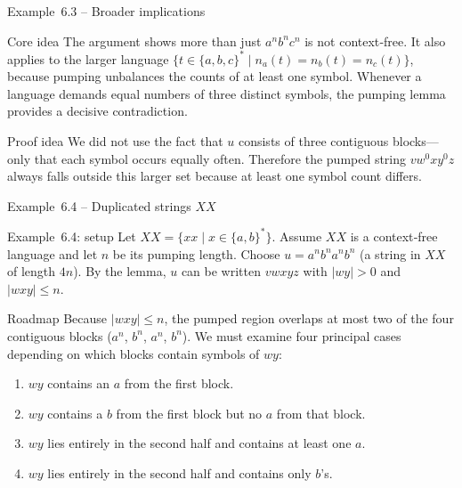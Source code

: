 \begin{frame}[t]{Example 6.3 – Broader implications}
  \begin{tblock}{Core idea}
    The argument shows more than just $a^n b^n c^n$ is not context‑free.
    It also applies to the larger language $\{ t \in \{a,b,c\}^* \mid
    n_a(t) = n_b(t) = n_c(t) \}$, because pumping unbalances the counts
    of at least one symbol.  Whenever a language demands equal numbers
    of three distinct symbols, the pumping lemma provides a decisive
    contradiction.
  \end{tblock}
  \begin{tblock}{Proof idea}
    We did not use the fact that $u$ consists of three contiguous
    blocks—only that each symbol occurs equally often.  Therefore the
    pumped string $v w^0 x y^0 z$ always falls outside this larger set
    because at least one symbol count differs.
  \end{tblock}
  \label{fr:6.1-13}
\end{frame}

\begin{frame}[t]{Example 6.4 – Duplicated strings $XX$}
  \begin{texample}{Example 6.4: setup}
    Let $XX = \{ x x \mid x \in \{a,b\}^* \}$.  Assume $XX$ is a
    context‑free language and let $n$ be its pumping length.  Choose
    $u = a^n b^n a^n b^n$ (a string in $XX$ of length $4n$).  By the
    lemma, $u$ can be written $v w x y z$ with $|w y|>0$ and
    $|w x y| \le n$.
  \end{texample}
  \begin{tblock}{Roadmap}
    Because $|w x y| \le n$, the pumped region overlaps at most two of
    the four contiguous blocks ($a^n$, $b^n$, $a^n$, $b^n$).  We must
    examine four principal cases depending on which blocks contain
    symbols of $w y$:
    \begin{enumerate}
      \item $w y$ contains an $a$ from the first block.
      \item $w y$ contains a $b$ from the first block but no $a$ from
        that block.
      \item $w y$ lies entirely in the second half and contains at
        least one $a$.
      \item $w y$ lies entirely in the second half and contains only
        $b$’s.
    \end{enumerate}
  \end{tblock}
  \label{fr:6.1-14}
\end{frame}

